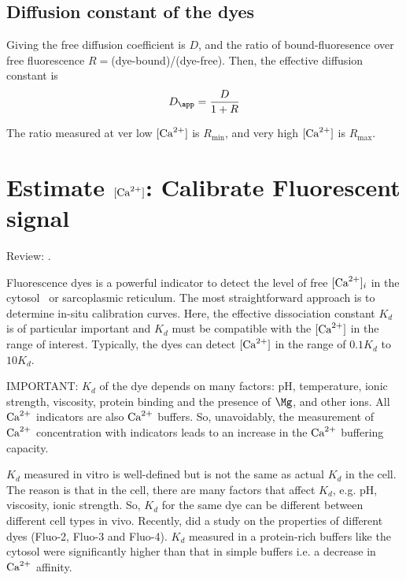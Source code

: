 \subsection{Diffusion constant of the dyes}
\label{sec:dye_diffusion}

Giving the free diffusion coefficient is $D$, and the ratio of bound-fluoresence
over free fluorescence $R=$(dye-bound)/(dye-free). Then, the effective diffusion
constant is
\begin{equation}
D_\app = \frac{D}{1+R}
\end{equation}

The ratio measured at ver low $[{\text{Ca}^{2+}}]$ is $R_\min$, and very high $[{\text{Ca}^{2+}}]$ is
$R_\max$.



\section{Estimate $[{\text{Ca}^{2+}}]$: Calibrate Fluorescent signal}
\label{sec:calibrate_Fluo}
\label{sec:estimate-Ca}

Review: \citep{takahashi1999,thomas2000, baylor2000, guatimosim2011}.

Fluorescence dyes is a powerful indicator to detect the level of free $[{\text{Ca}^{2+}}]_i$
in the cytosol~\citep{baylor2010} or sarcoplasmic reticulum. The most
straightforward approach is to determine in-situ calibration curves. Here, the
effective dissociation constant $K_d$ is of particular important and $K_d$ must
be compatible with the $[{\text{Ca}^{2+}}]$ in the range of interest. Typically, the dyes can
detect $[{\text{Ca}^{2+}}]$ in the range of $0.1K_d$ to $10K_d$.

\begin{framed}

IMPORTANT: $K_d$ of the dye depends on many factors: pH, temperature, ionic
strength, viscosity, protein binding and the presence of $\Mg$, and other ions.
All ${\text{Ca}^{2+}}$ indicators are also ${\text{Ca}^{2+}}$ buffers. So, unavoidably, the measurement of
${\text{Ca}^{2+}}$ concentration with indicators leads to an increase in the ${\text{Ca}^{2+}}$ buffering
capacity.

$K_d$ measured in vitro is well-defined but is not the same as actual $K_d$ in
the cell. The reason is that in the cell, there are many factors that affect
$K_d$, e.g. pH, viscosity, ionic strength. So, $K_d$ for the same dye can be
different between different cell types in vivo. Recently, \citep{hagen2012} did
a study on the properties of different dyes (Fluo-2, Fluo-3 and Fluo-4). $K_d$
measured in a protein-rich buffers like the cytosol were significantly higher
than that in simple buffers i.e. a decrease in ${\text{Ca}^{2+}}$ affinity.
\end{framed}


